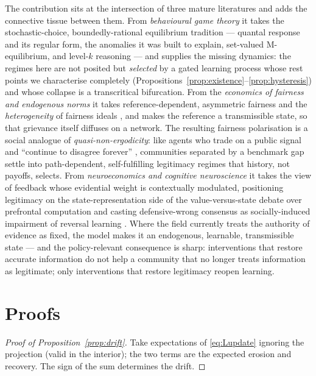 \documentclass[11pt]{article}
\newcommand{\1}{\mathbf{1}}
\begin{document}
The contribution sits at the intersection of three mature literatures and adds
the connective tissue between them. From \emph{behavioural game theory} it takes
the stochastic-choice, boundedly-rational equilibrium tradition --- quantal
response and its regular form, the anomalies it was built to explain, set-valued
M-equilibrium, and level-$k$ reasoning
\citep{McKelveyPalfrey1995,GoereeHoltPalfrey2005,GoereeHolt2001,GoereeLouis2021,CrawfordCostaGomesIriberri2013}
--- and supplies the missing dynamics: the regimes here are not posited but
\emph{selected} by a gated learning process whose rest points we characterise
completely (Propositions~\ref{prop:existence}--\ref{prop:hysteresis}) and whose
collapse is a transcritical bifurcation. From the \emph{economics of fairness and
endogenous norms} it takes reference-dependent, asymmetric fairness and the
\emph{heterogeneity} of fairness ideals
\citep{FehrSchmidt1999,CharnessRabin2002,CappelenHoleSorensenTungodden2007,Andre2024ShallowMeritocracy,Bowles1998},
and makes the reference a transmissible state, so that grievance itself diffuses
on a network. The resulting fairness polarisation is a social analogue of
\emph{quasi-non-ergodicity}: like agents who trade on a public signal and
``continue to disagree forever'' \citep{BouchaudFarmer2023}, communities separated
by a benchmark gap settle into path-dependent, self-fulfilling legitimacy
regimes that history, not payoffs, selects. From \emph{neuroeconomics and
cognitive neuroscience} it takes the view of feedback whose evidential weight is
contextually modulated, positioning legitimacy on the state-representation side of
the value-versus-state debate over prefrontal computation
\citep{PadoaSchioppaConen2017,HaydenNiv2021,JoinerPivaTurrinChang2017} and casting
defensive-wrong consensus as socially-induced impairment of reversal learning
\citep{IzquierdoBrigmanRadkeRudebeckHolmes2017}. Where the field currently treats
the authority of evidence as fixed, the model makes it an endogenous, learnable,
transmissible state --- and the policy-relevant consequence is sharp:
interventions that restore accurate information do not help a community that no
longer treats information as legitimate; only interventions that restore
legitimacy reopen learning.

\appendix
\section{Proofs}
\label{app:proofs}

\begin{proof}[Proof of Proposition~\ref{prop:drift}]
Take expectations of \eqref{eq:Lupdate} ignoring the projection (valid in the
interior); the two terms are the expected erosion and recovery. The sign of the
sum determines the drift.
\end{proof}
\end{document}
